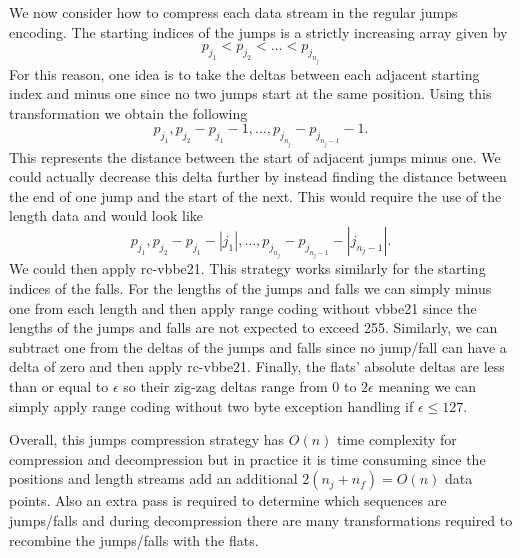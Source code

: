 We now consider how to compress each data stream in the regular jumps
encoding. The starting indices of the
jumps is a strictly increasing
array given by
\[p_{j_1}<p_{j_2}<\dots<p_{j_{n_j}}\]
For this reason, one idea is to take the deltas between each adjacent starting index
and minus one since no two jumps start at the same position. Using this
transformation we obtain the following
\[p_{j_1},p_{j_2}-p_{j_1}-1,\dots,p_{j_{n_j}}-p_{j_{n_j-1}}-1.\]
This represents the distance between the start of adjacent jumps minus one.
We could actually decrease this delta further by instead finding the distance
between the end of one jump and the start of the next. This would require the
use of the length data and would look like
\[p_{j_1},p_{j_2}-p_{j_1}-|j_1|,\dots,p_{j_{n_j}}-p_{j_{n_j-1}}-|j_{n_j-1}|.\]
We could then apply rc-vbbe21. This strategy works similarly for the starting
indices of the falls. For the lengths of the jumps and falls we can simply minus
one from each length and then apply range coding without vbbe21 since the
lengths of the jumps and falls are not expected to exceed 255. Similarly, we can
subtract one from the deltas of the jumps and falls since no jump/fall can have
a delta of zero and then apply rc-vbbe21. Finally, the flats' absolute deltas
are less than or equal to $\epsilon$ so their zig-zag deltas range from 0 to
$2\epsilon$ meaning we can simply apply range coding without two byte exception
handling if $\epsilon \le 127$.

Overall, this jumps compression strategy has $O(n)$ time complexity for
compression and decompression but in practice it is time consuming since the
positions and length streams add an additional $2(n_j+n_f)=O(n)$ data points.
Also an extra pass is required to determine which sequences are jumps/falls and
during decompression there are many transformations required to recombine the
jumps/falls with the flats.
